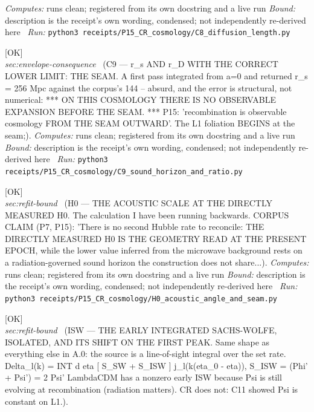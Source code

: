 \begin{description}
\emph{Computes:} runs clean; registered from its own docstring and a live run
 \emph{Bound:} description is the receipt's own wording, condensed; not independently re-derived here
\ \emph{Run:} \texttt{python3 receipts/P15\_CR\_cosmology/C8\_diffusion\_length.py}
\item[\rcptlabel{C9_sound_horizon_and_ratio}{P15R55}\textbf{P15R55}\quad\texttt{C9\_sound\_horizon\_and\_ratio}]\hfill\textsf{[OK]}\\
\textit{sec:envelope-consequence} \ (C9 --- r\_s AND r\_D WITH THE CORRECT LOWER LIMIT: THE SEAM. A first pass integrated from a=0 and returned r\_s = 256 Mpc against the corpus's 144 -- absurd, and the error is structural, not numerical: *** ON THIS COSMOLOGY THERE IS NO OBSERVABLE EXPANSION BEFORE THE SEAM. *** P15: 'recombination is observable cosmology FROM THE SEAM OUTWARD'. The L1 foliation BEGINS at the seam;). 
\emph{Computes:} runs clean; registered from its own docstring and a live run
 \emph{Bound:} description is the receipt's own wording, condensed; not independently re-derived here
\ \emph{Run:} \texttt{python3 receipts/P15\_CR\_cosmology/C9\_sound\_horizon\_and\_ratio.py}
\item[\rcptlabel{H0_acoustic_angle_and_seam}{P15R56}\textbf{P15R56}\quad\texttt{H0\_acoustic\_angle\_and\_seam}]\hfill\textsf{[OK]}\\
\textit{sec:refit-bound} \ (H0 --- THE ACOUSTIC SCALE AT THE DIRECTLY MEASURED H0. The calculation I have been running backwards. CORPUS CLAIM (P7, P15): 'There is no second Hubble rate to reconcile: THE DIRECTLY MEASURED H0 IS THE GEOMETRY READ AT THE PRESENT EPOCH, while the lower value inferred from the microwave background rests on a radiation-governed sound horizon the construction does not share...). 
\emph{Computes:} runs clean; registered from its own docstring and a live run
 \emph{Bound:} description is the receipt's own wording, condensed; not independently re-derived here
\ \emph{Run:} \texttt{python3 receipts/P15\_CR\_cosmology/H0\_acoustic\_angle\_and\_seam.py}
\item[\rcptlabel{ISW_line_of_sight}{P15R57}\textbf{P15R57}\quad\texttt{ISW\_line\_of\_sight}]\hfill\textsf{[OK]}\\
\textit{sec:refit-bound} \ (ISW --- THE EARLY INTEGRATED SACHS-WOLFE, ISOLATED, AND ITS SHIFT ON THE FIRST PEAK. Same shape as everything else in A.0: the source is a line-of-sight integral over the set rate. Delta\_l(k) = INT d eta [ S\_SW + S\_ISW ] j\_l(k(eta\_0 - eta)), S\_ISW = (Phi' + Psi') = 2 Psi' LambdaCDM has a nonzero early ISW because Psi is still evolving at recombination (radiation matters). CR does not: C11 showed Psi is constant on L1.). 

\end{description}
